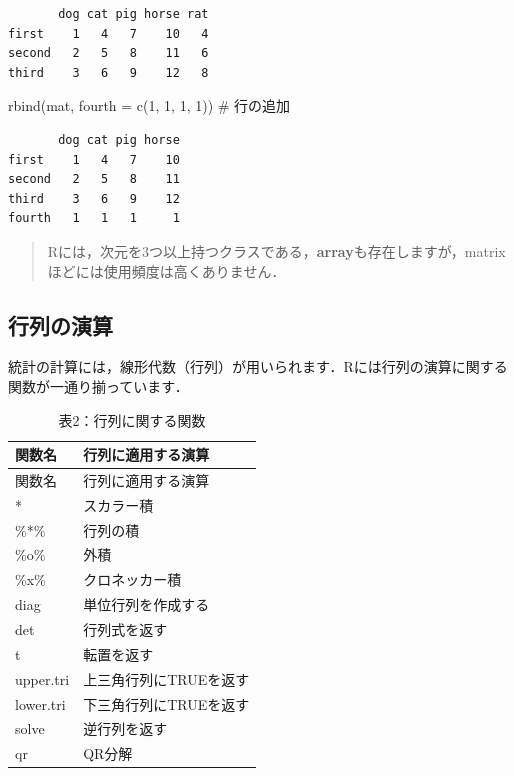 \documentclass[
  letterpaper,
  DIV=11,
  numbers=noendperiod]{scrreprt}
\newenvironment{Shaded}{\begin{snugshade}}{\end{snugshade}}
\newcommand{\AttributeTok}[1]{\textcolor[rgb]{0.40,0.45,0.13}{#1}}
\newcommand{\CommentTok}[1]{\textcolor[rgb]{0.37,0.37,0.37}{#1}}
\newcommand{\DecValTok}[1]{\textcolor[rgb]{0.68,0.00,0.00}{#1}}
\newcommand{\FunctionTok}[1]{\textcolor[rgb]{0.28,0.35,0.67}{#1}}
\newcommand{\NormalTok}[1]{\textcolor[rgb]{0.00,0.23,0.31}{#1}}
\begin{document}
\begin{verbatim}
       dog cat pig horse rat
first    1   4   7    10   4
second   2   5   8    11   6
third    3   6   9    12   8
\end{verbatim}

\begin{Shaded}
\begin{Highlighting}[]
\FunctionTok{rbind}\NormalTok{(mat, }\AttributeTok{fourth =} \FunctionTok{c}\NormalTok{(}\DecValTok{1}\NormalTok{, }\DecValTok{1}\NormalTok{, }\DecValTok{1}\NormalTok{, }\DecValTok{1}\NormalTok{)) }\CommentTok{\# 行の追加}
\end{Highlighting}
\end{Shaded}

\begin{verbatim}
       dog cat pig horse
first    1   4   7    10
second   2   5   8    11
third    3   6   9    12
fourth   1   1   1     1
\end{verbatim}

\begin{quote}
Rには，次元を3つ以上持つクラスである，\textbf{array}も存在しますが，matrixほどには使用頻度は高くありません．
\end{quote}

\hypertarget{ux884cux5217ux306eux6f14ux7b97-1}{%
\subsection{行列の演算}\label{ux884cux5217ux306eux6f14ux7b97-1}}

統計の計算には，線形代数（行列）が用いられます．Rには行列の演算に関する関数が一通り揃っています．

\begin{longtable}[]{@{}ll@{}}
\caption{表2：行列に関する関数}\tabularnewline
\toprule()
関数名 & 行列に適用する演算 \\
\midrule()
\endfirsthead
\toprule()
関数名 & 行列に適用する演算 \\
\midrule()
\endhead
* & スカラー積 \\
\%*\% & 行列の積 \\
\%o\% & 外積 \\
\%x\% & クロネッカー積 \\
diag & 単位行列を作成する \\
det & 行列式を返す \\
t & 転置を返す \\
upper.tri & 上三角行列にTRUEを返す \\
lower.tri & 下三角行列にTRUEを返す \\
solve & 逆行列を返す \\
qr & QR分解 \\
\bottomrule()
\end{longtable}
\end{document}
